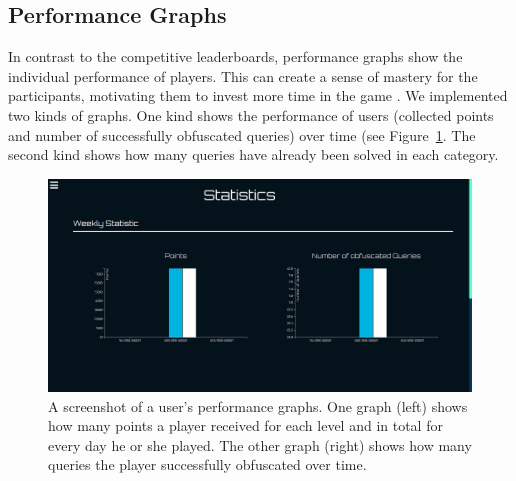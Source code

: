 \subsection*{Performance Graphs}
In contrast to the competitive leaderboards, performance graphs show the individual performance of players. This can create a sense of mastery for the participants, motivating them to invest more time in the game \cite{wirkungGamificationBuch}. We implemented two kinds of graphs. One kind shows the performance of users (collected points and number of successfully obfuscated queries) over time (see Figure~\ref{fig:statistics}. The second kind shows how many queries have already been solved in each category.
\begin{figure}[h]
    \includegraphics[width=1.0\textwidth]{graphics/game/statistics.pdf}
    \caption{A screenshot of a user's performance graphs. One graph (left) shows how many points a player received for each level and in total for every day he or she played. The other graph (right) shows how many queries the player successfully obfuscated over time.}
    \label{fig:statistics}
\end{figure}

